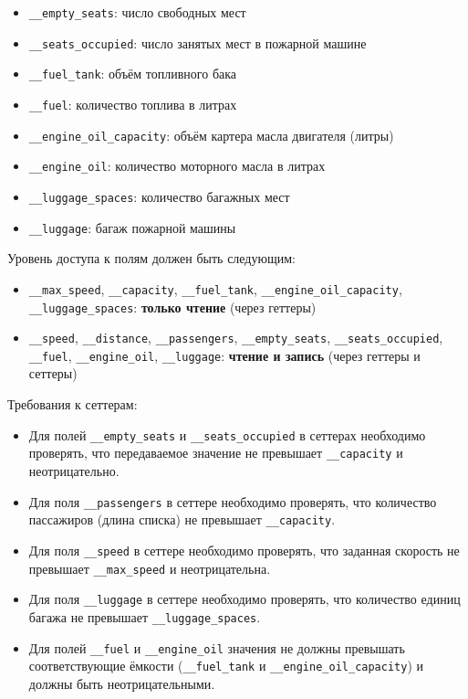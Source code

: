 \begin{enumerate}
\begin{itemize}
    \item \texttt{\_\_empty\_seats}: число свободных мест  
    \item \texttt{\_\_seats\_occupied}: число занятых мест в пожарной машине  
    \item \texttt{\_\_fuel\_tank}: объём топливного бака  
    \item \texttt{\_\_fuel}: количество топлива в литрах  
    \item \texttt{\_\_engine\_oil\_capacity}: объём картера масла двигателя (литры)  
    \item \texttt{\_\_engine\_oil}: количество моторного масла в литрах  
    \item \texttt{\_\_luggage\_spaces}: количество багажных мест  
    \item \texttt{\_\_luggage}: багаж пожарной машины  
\end{itemize}
Уровень доступа к полям должен быть следующим:
\begin{itemize}
    \item \texttt{\_\_max\_speed}, \texttt{\_\_capacity}, \texttt{\_\_fuel\_tank}, \texttt{\_\_engine\_oil\_capacity}, \texttt{\_\_luggage\_spaces}: \textbf{только чтение} (через геттеры)  
    \item \texttt{\_\_speed}, \texttt{\_\_distance}, \texttt{\_\_passengers}, \texttt{\_\_empty\_seats}, \texttt{\_\_seats\_occupied}, \texttt{\_\_fuel}, \texttt{\_\_engine\_oil}, \texttt{\_\_luggage}: \textbf{чтение и запись} (через геттеры и сеттеры)
\end{itemize}
Требования к сеттерам:
\begin{itemize}
    \item Для полей \texttt{\_\_empty\_seats} и \texttt{\_\_seats\_occupied} в сеттерах необходимо проверять, что передаваемое значение не превышает \texttt{\_\_capacity} и неотрицательно.  
    \item Для поля \texttt{\_\_passengers} в сеттере необходимо проверять, что количество пассажиров (длина списка) не превышает \texttt{\_\_capacity}.  
    \item Для поля \texttt{\_\_speed} в сеттере необходимо проверять, что заданная скорость не превышает \texttt{\_\_max\_speed} и неотрицательна.  
    \item Для поля \texttt{\_\_luggage} в сеттере необходимо проверять, что количество единиц багажа не превышает \texttt{\_\_luggage\_spaces}.
    \item Для полей \texttt{\_\_fuel} и \texttt{\_\_engine\_oil} значения не должны превышать соответствующие ёмкости (\texttt{\_\_fuel\_tank} и \texttt{\_\_engine\_oil\_capacity}) и должны быть неотрицательными.

\end{itemize}
\end{enumerate}
